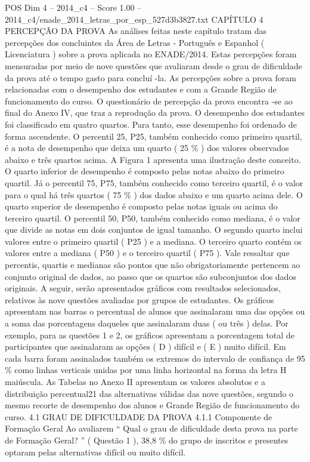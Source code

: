 \begin{textsample}{POS Dim 4 – 2014\_c4 – Score 1.00 – 2014\_c4/enade\_2014\_letras\_por\_esp\_527d3b3827.txt}  \label{ex:f4_pos_207}
CAPÍTULO 4 PERCEPÇÃO DA PROVA As análises feitas neste capítulo tratam das percepções dos concluintes da Área de Letras - Português e Espanhol ( Licenciatura ) sobre a prova aplicada no ENADE/2014.
Estas percepções foram mensuradas por meio de nove questões que avaliaram desde o grau de dificuldade da prova até o tempo gasto para concluí -la.
As percepções sobre a prova foram relacionadas com o desempenho dos estudantes e com a Grande Região de funcionamento do curso.
O questionário de percepção da prova encontra -se ao final do Anexo IV, que traz a reprodução da prova.
O desempenho dos estudantes foi classificado em quatro quartos.
Para tanto, esse desempenho foi ordenado de forma ascendente.
O percentil 25, P25, também conhecido como primeiro quartil, é a nota de desempenho que deixa um quarto ( 25 \% ) dos valores observados abaixo e três quartos acima.
A Figura 1 apresenta uma ilustração deste conceito.
O quarto inferior de desempenho é composto pelas notas abaixo do primeiro quartil.
Já o percentil 75, P75, também conhecido como terceiro quartil, é o valor para o qual há três quartos ( 75 \% ) dos dados abaixo e um quarto acima dele.
O quarto superior de desempenho é composto pelas notas iguais ou acima do terceiro quartil.
O percentil 50, P50, também conhecido como mediana, é o valor que divide as notas em dois conjuntos de igual tamanho.
O segundo quarto inclui valores entre o primeiro quartil ( P25 ) e a mediana.
O terceiro quarto contém os valores entre a mediana ( P50 ) e o terceiro quartil ( P75 ).
Vale ressaltar que percentis, quartis e medianas são pontos que não obrigatoriamente pertencem ao conjunto original de dados, ao passo que os quartos são subconjuntos dos dados originais.
A seguir, serão apresentados gráficos com resultados selecionados, relativos às nove questões avaliadas por grupos de estudantes.
Os gráficos apresentam nas barras o percentual de alunos que assinalaram uma das opções ou a soma das porcentagens daqueles que assinalaram duas ( ou três ) delas.
Por exemplo, para as questões 1 e 2, os gráficos apresentam a porcentagem total de participantes que assinalaram as opções ( D ) difícil e ( E ) muito difícil.
Em cada barra foram assinalados também os extremos do intervalo de confiança de 95 \% como linhas verticais unidas por uma linha horizontal na forma da letra H maiúscula.
As Tabelas no Anexo II apresentam os valores absolutos e a distribuição percentual21 das alternativas válidas das nove questões, segundo o mesmo recorte de desempenho dos alunos e Grande Região de funcionamento do curso. 4.1 GRAU DE DIFICULDADE DA PROVA 4.1.1 Componente de Formação Geral Ao avaliarem “ Qual o grau de dificuldade desta prova na parte de Formação Geral? ” ( Questão 1 ), 38,8 \% do grupo de inscritos e presentes optaram pelas alternativas difícil ou muito difícil.

\end{textsample}
